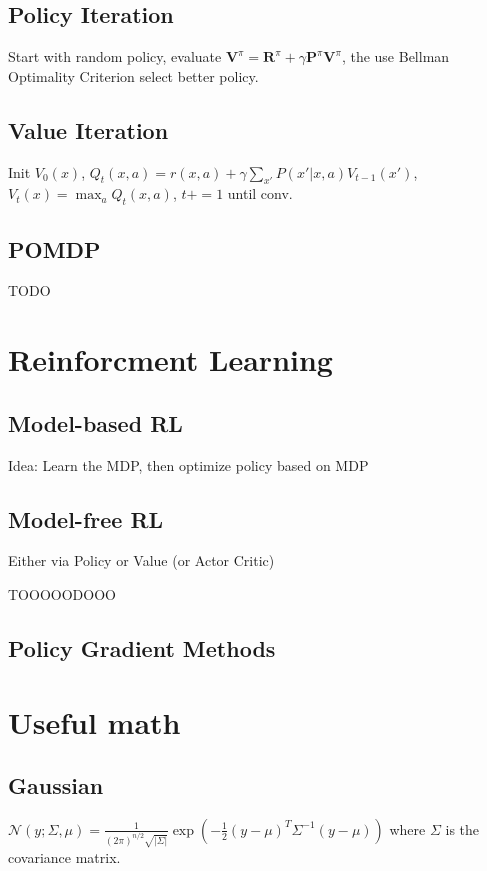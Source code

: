 \documentclass[11pt]{article}
\newcommand{\gauss}{\mathcal{N}}
\begin{document}
\begin{multicols*}{3}
\subsection*{Policy Iteration}
Start with random policy, evaluate $\mathbf{V}^\pi = \mathbf{R}^\pi + \gamma \mathbf{P}^\pi \mathbf{V}^\pi$, the use Bellman Optimality Criterion select better policy.
\subsection*{Value Iteration}
Init $V_0(x)$, $Q_t(x,a) = r(x,a) + \gamma \sum_{x'} P(x'|x,a)V_{t-1}(x')$, $V_t(x) = \max_a Q_t (x,a)$, $t+=1$ until conv.
\subsection*{POMDP}
TODO

\section*{Reinforcment Learning}
\subsection*{Model-based RL}
Idea: Learn the MDP, then optimize policy based on MDP

\subsection*{Model-free RL}
Either via Policy or Value (or Actor Critic)



TOOOOODOOO

\subsection*{Policy Gradient Methods}



\newpage

\section*{Useful math}
\subsection*{Gaussian}
$\gauss(y;\Sigma,\mu) = \frac{1}{(2\pi)^{n/2} \sqrt{|\Sigma|}} \exp \left( - \frac{1}{2} (y-\mu)^T \Sigma^{-1}(y-\mu) \right) $ where $\Sigma$ is the covariance matrix.


\end{multicols*}
\end{document}
